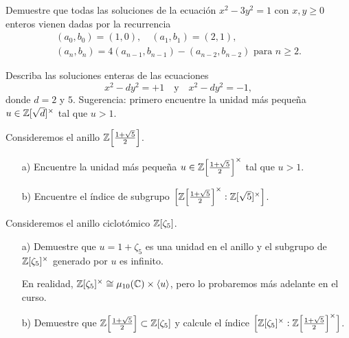 \begin{ejercicio}
  Demuestre que todas las soluciones de la ecuación $x^2 - 3y^2 = 1$ con
  $x,y\ge 0$ enteros vienen dadas por la recurrencia
  \begin{gather*}
    (a_0,b_0) = (1,0), \quad (a_1,b_1) = (2,1),\\
    (a_n,b_n) = 4 (a_{n-1}, b_{n-1}) - (a_{n-2}, b_{n-2}) \text{ para }n\ge 2.
  \end{gather*}
\end{ejercicio}

\begin{ejercicio}
  Describa las soluciones enteras de las ecuaciones
  $$x^2 - dy^2 = +1 \quad\text{y}\quad x^2 - dy^2 = -1,$$
  donde $d = 2$ y $5$.
  Sugerencia: primero encuentre la unidad más pequeña
  $u \in \mathbb{Z}[\sqrt{d}]^\times$ tal que $u > 1$.
\end{ejercicio}

\begin{ejercicio}
  Consideremos el anillo $\mathbb{Z} \Bigl[\frac{1+\sqrt{5}}{2}\Bigr]$.

  \begin{enumerate}
  \item[a)] Encuentre la unidad más pequeña
    $u \in \mathbb{Z} \Bigl[\frac{1+\sqrt{5}}{2}\Bigr]^\times$ tal que $u > 1$.

  \item[b)] Encuentre el índice de subgrupo
    $\Bigl[\mathbb{Z} \Bigl[\frac{1+\sqrt{5}}{2}\Bigr]^\times :
           \mathbb{Z} [\sqrt{5}]^\times\Bigr]$.
  \end{enumerate}
\end{ejercicio}

\begin{ejercicio}
  Consideremos el anillo ciclotómico $\mathbb{Z} [\zeta_5]$.

  \begin{enumerate}
  \item[a)] Demuestre que $u = 1 + \zeta_5$ es una unidad en el anillo 
    y el subgrupo de $\mathbb{Z} [\zeta_5]^\times$ generado por $u$ es infinito.

    En realidad,
    $\mathbb{Z} [\zeta_5]^\times \cong \mu_{10} (\mathbb{C}) \times \langle u\rangle$,
    pero lo probaremos más adelante en el curso.

  \item[b)] Demuestre que
    $\mathbb{Z} \Bigl[\frac{1 + \sqrt{5}}{2}\Bigr] \subset \mathbb{Z} [\zeta_5]$ y calcule
    el índice
    $\Bigl[\mathbb{Z} [\zeta_5]^\times :
           \mathbb{Z} \Bigl[\frac{1 + \sqrt{5}}{2}\Bigr]^\times \Bigr]$.
  \end{enumerate}
\end{ejercicio}

